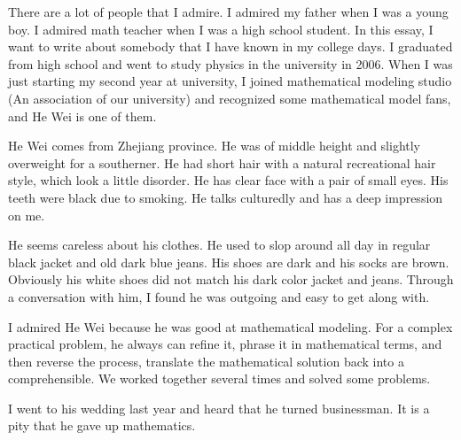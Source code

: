 \documentclass[12pt,a4paper]{caspset}
\begin{document}
There are a lot of people that I admire. I admired my father when I was a young boy. I admired math teacher when I was a high school student. In this essay, I want to write about somebody that I have known in my college days. I graduated from high school and went to study physics in the university in 2006. When I was just starting my second year at university, I joined mathematical modeling studio (An association of our university) and recognized some mathematical model fans, and He Wei is one of them.

He Wei comes from Zhejiang province. He was of middle height and slightly overweight for a southerner. He had short hair with a natural recreational hair style, which look a little disorder. He has clear face with a pair of small eyes. His teeth were black due to smoking. He talks culturedly and has a deep impression on me.

He seems careless about his clothes. He used to slop around all day in regular black jacket and old dark blue jeans. His shoes are dark and his socks are brown. Obviously his white shoes did not match his dark color jacket and jeans. Through a conversation with him, I found he was outgoing and easy to get along with.

I admired He Wei because he was good at mathematical modeling. For a complex practical problem, he always can refine it, phrase it in mathematical terms, and then reverse the process, translate the mathematical solution back into a comprehensible. We worked together several times and solved some problems.

I went to his wedding last year and heard that he turned businessman. It is a pity that he gave up mathematics.
\end{document}

